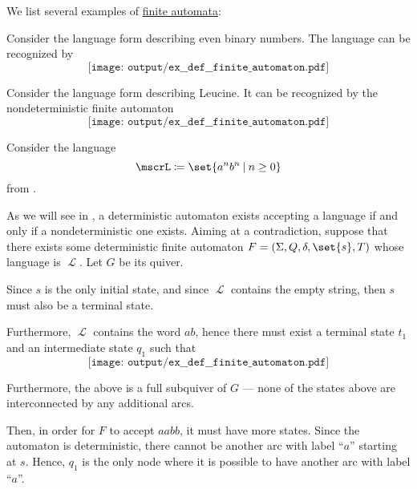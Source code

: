 \begin{example}\label{ex:def:finite_automaton}
  We list several examples of \hyperref[def:finite_automaton]{finite automata}:
  \begin{thmenum}
     Consider the language form  describing even binary numbers. The language can be recognized by
    \begin{equation*}
      \texttt{[image: output/ex\_\_def\_\_finite\_automaton.pdf]}
    \end{equation*}

     Consider the language form  describing Leucine. It can be recognized by the nondeterministic finite automaton
    \begin{equation*}
      \texttt{[image: output/ex\_\_def\_\_finite\_automaton.pdf]}
    \end{equation*}

     Consider the language
    \begin{equation*}
      \mscrL \coloneqq \set{ a^n b^n \given n \geq 0 }
    \end{equation*}
    from .

    As we will see in , a deterministic automaton exists accepting a language if and only if a nondeterministic one exists. Aiming at a contradiction, suppose that there exists some deterministic finite automaton \( F = (\Sigma, Q, \delta, \set{ s }, T) \) whose language is \( \mscrL \). Let \( G \) be its quiver.

    Since \( s \) is the only initial state, and since \( \mscrL \) contains the empty string, then \( s \) must also be a terminal state.

    Furthermore, \( \mscrL \) contains the word \( ab \), hence there must exist a terminal state \( t_1 \) and an intermediate state \( q_1 \) such that
    \begin{equation*}
      \texttt{[image: output/ex\_\_def\_\_finite\_automaton.pdf]}
    \end{equation*}

    Furthermore, the above is a full subquiver of \( G \) --- none of the states above are interconnected by any additional arcs.

    Then, in order for \( F \) to accept \( aabb \), it must have more states. Since the automaton is deterministic, there cannot be another arc with label \enquote{\( a \)} starting at \( s \). Hence, \( q_1 \) is the only node where it is possible to have another arc with label \enquote{\( a \)}.


\end{thmenum}
\end{example}
